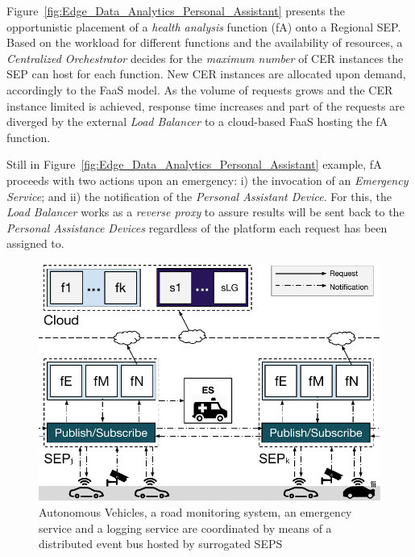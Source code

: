 Figure~\ref{fig:Edge_Data_Analytics_Personal_Assistant} presents the opportunistic placement of a \textit{health analysis} function (fA) onto a Regional SEP. Based on the workload for different functions and the availability of resources, a \textit{Centralized Orchestrator} decides for the \textit{maximum number} of CER instances the SEP can host for each function.
New CER instances are allocated upon demand, accordingly to the FaaS model. As the volume of requests grows and the CER instance limited is achieved, response time increases and part of the requests are diverged
by the external \textit{Load Balancer} to a cloud-based FaaS hosting the fA function.

Still in Figure~\ref{fig:Edge_Data_Analytics_Personal_Assistant} example, 
fA proceeds with two actions upon an emergency: i) the invocation of an 
\textit{Emergency Service}; and ii) the notification of the \textit{Personal Assistant Device}. For this, the \textit{Load Balancer} works as a \textit{reverse proxy} to assure results will be sent back to the \textit{Personal Assistance Devices} regardless of the platform each request has been assigned to.


\begin{figure}[bp]
	\centering
	\includegraphics[width=1\linewidth]{Figs/Edge_Coordination_AVs_wide.pdf}
	\caption{Autonomous Vehicles, a road monitoring system, an emergency service and a logging service are coordinated by means of a distributed event bus hosted by surrogated SEPS}
	\label{fig:Edge_Coordination_AVs}
\end{figure}


